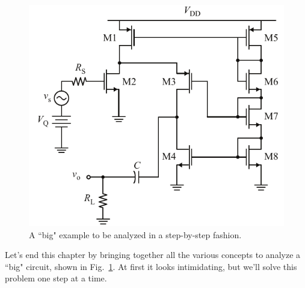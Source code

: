 \section{\topicE}
\begin{figure}[tb]
\centering
\includegraphics[scale=1]{16cascode_folded}
\caption{A ``big" example to be analyzed in a step-by-step fashion.}
\label{fig:16cascode_folded}
\end{figure}
Let's end this chapter by bringing together all the various concepts to analyze a ``big" circuit, shown in Fig.~\ref{fig:16cascode_folded}.  At first it looks intimidating, but we'll solve this problem one step at a time.
